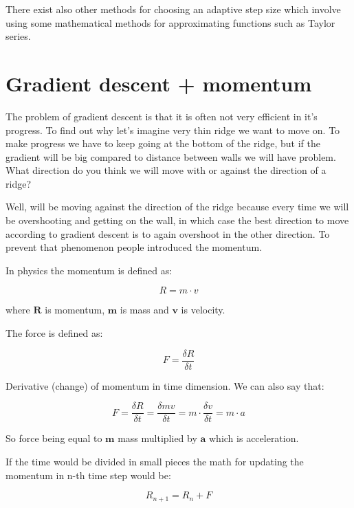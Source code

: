There exist also other methods for choosing an adaptive step size which involve using some mathematical methods for approximating functions such as Taylor series.


\section{ Gradient descent + momentum}

The problem of gradient descent is that it is often not very efficient in it’s progress. To find out why let’s imagine very thin ridge we want to move on. To make progress we have to keep going at the bottom of the ridge, but if the gradient will be big compared to distance between walls we will have problem. What direction do you think we will move with or against
the direction of a ridge?


Well, will be moving against the direction of the ridge because every time we will be overshooting and getting on the wall, in which case the best direction to move according to gradient descent is to again overshoot in the other direction. To prevent that phenomenon people introduced the momentum.

In physics the momentum is defined as:

\begin{equation}
	R = m \cdot v
\end{equation}

\noindent where $\boldsymbol{R}$ is momentum, $\boldsymbol{m}$ is mass and $\boldsymbol{v}$ is velocity.

The force is defined as:

\begin{equation}
	F = \frac{\delta R}{\delta t}
\end{equation}

\noindent Derivative (change) of momentum in time dimension. We can also say that:

\begin{equation}
	F = \frac{\delta R}{\delta t} =  \frac{\delta mv}{\delta t} = m \cdot \frac{\delta v}{\delta t} = m \cdot a
\end{equation}

\noindent So force being equal to $\boldsymbol{m}$ mass multiplied by $\boldsymbol{a}$ which is acceleration.

If the time would be divided in small pieces the math for updating the momentum in n-th time step would be:

\begin{equation}
	R_{n+1} = R_n + F
\end{equation}

